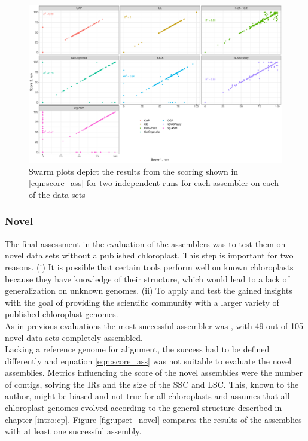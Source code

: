 \begin{figure}[H]
\centering
\includegraphics[height=.45\textheight, width=.95\textwidth]{Figures/repro}
\decoRule
\caption[Comparison between two runs with the same assembler for consistency testing ]{Swarm plots depict the
  results from the scoring shown in \ref{eqn:score_ass} for two independent runs for each assembler on each of
  the data sets}
\label{fig:consisplot}
\end{figure}


\subsubsection{Novel}
 
The final assessment in the evaluation of the assemblers was to test them on novel data sets without a
published chloroplast. This step is important for two reasons. (i) It is possible that certain tools perform
well on known chloroplasts because they have knowledge of their structure, which would lead to a lack of
generalization on unknown genomes. (ii) To apply and test the gained insights with the goal of providing
the scientific community with a larger variety of published chloroplast genomes.\\
As in previous evaluations the most successful assembler was \go, with 49 out of 105 novel data sets completely assembled. \\
Lacking a reference genome for alignment, the success had to be defined differently and equation
\ref{eqn:score_ass} was not suitable to evaluate the novel assemblies. Metrics influencing the score of the
novel assemblies were the number of contigs, solving the IRs and the size of the SSC and LSC. This, known to
the author, might be biased and not true for all chloroplasts and assumes that all chloroplast genomes evolved
according to the general structure described in chapter \ref{intro:cp}. Figure \ref{fig:upset_novel} compares
the results of the assemblies with at least one successful assembly.

